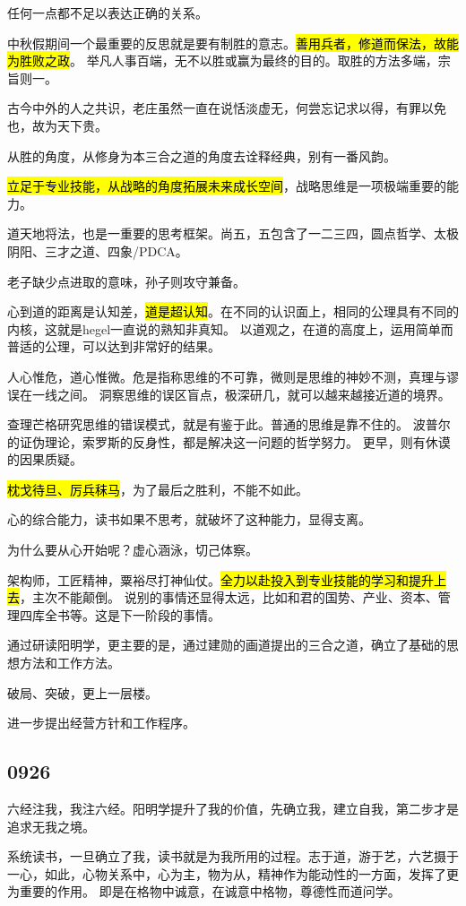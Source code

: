 任何一点都不足以表达正确的关系。

中秋假期间一个最重要的反思就是要有制胜的意志。\hl{善用兵者，修道而保法，故能为胜败之政}。
举凡人事百端，无不以胜或赢为最终的目的。取胜的方法多端，宗旨则一。

古今中外的人之共识，老庄虽然一直在说恬淡虚无，何尝忘记求以得，有罪以免也，故为天下贵。

从胜的角度，从修身为本三合之道的角度去诠释经典，别有一番风韵。

\hl{立足于专业技能，从战略的角度拓展未来成长空间}，战略思维是一项极端重要的能力。

道天地将法，也是一重要的思考框架。尚五，五包含了一二三四，圆点哲学、太极阴阳、三才之道、四象/PDCA。

老子缺少点进取的意味，孙子则攻守兼备。

心到道的距离是认知差，\hl{道是超认知}。在不同的认识面上，相同的公理具有不同的内核，这就是hegel一直说的熟知非真知。
以道观之，在道的高度上，运用简单而普适的公理，可以达到非常好的结果。

人心惟危，道心惟微。危是指称思维的不可靠，微则是思维的神妙不测，真理与谬误在一线之间。
洞察思维的误区盲点，极深研几，就可以越来越接近道的境界。

查理芒格研究思维的错误模式，就是有鉴于此。普通的思维是靠不住的。
波普尔的证伪理论，索罗斯的反身性，都是解决这一问题的哲学努力。
更早，则有休谟的因果质疑。

\hl{枕戈待旦、厉兵秣马}，为了最后之胜利，不能不如此。

心的综合能力，读书如果不思考，就破坏了这种能力，显得支离。

为什么要从心开始呢？虚心涵泳，切己体察。

架构师，工匠精神，粟裕尽打神仙仗。\hl{全力以赴投入到专业技能的学习和提升上去}，主次不能颠倒。
说别的事情还显得太远，比如和君的国势、产业、资本、管理四库全书等。这是下一阶段的事情。

通过研读阳明学，更主要的是，通过建勋的画道提出的三合之道，确立了基础的思想方法和工作方法。

破局、突破，更上一层楼。

进一步提出经营方针和工作程序。

\subsection{0926}

六经注我，我注六经。阳明学提升了我的价值，先确立我，建立自我，第二步才是追求无我之境。

系统读书，一旦确立了我，读书就是为我所用的过程。志于道，游于艺，六艺摄于一心，如此，心物关系中，心为主，物为从，精神作为能动性的一方面，发挥了更为重要的作用。
即是在格物中诚意，在诚意中格物，尊德性而道问学。

